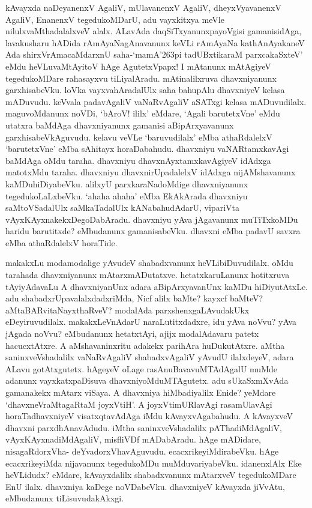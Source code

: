 \noindent
kAvayxda naDeyanenxV AgaliV, mUlavanenxV AgaliV, dheyxVyavanenxV AgaliV, EnanenxV tegedukoMDarU, adu vayxkitxya meVle nilulxvaMthadalalxveV alalx. ALavAda daqSiTxyanunxpayoVgisi gamanisidAga, lavakusharu hADida rAmAyaNagAnavanunx keVLi rAmAyaNa kathAnAyakaneV Ada shirxVrAmacaMdarxnU saha-`ma\-mA\char'263pi tadUBxtikaraM\label{236} parxcakaSxteV' eMdu heVLuvaMtAyitoV hAge AgutetxVpapx! I mAtanunx mAtAgiyeV tegedukoMDare rahasayxvu tiLiyalAradu. mAtinalilxruva dhavxniyanunx garxhisabeVku. loVka vayxva\-hAra\-dalUlx saha bahupAlu dhavxniyeV kelasa mADuvudu. keVvala padavAgaliV vaNaRvAgaliV aSATxgi kelasa\- mADuvudilalx. maguvoMdanunx noVDi, `bAroV! ililx' eMdare, `Agali barutetxVne' eMdu utatxra baMdAga dhavxniyanunx gamanisi aBipArxyavanunx garxhisabeVkAguvudu. kelavu veVLe `baruvudilalx' eMba athaRdalelxV `barutetxVne' eMba sAhitayx horaDabahudu. dhavxniyu vaNARtamxkavAgi baMdAga oMdu taraha. dhavxniyu dhavxnAyxtamxkavAgiyeV idAdxga matotxMdu taraha. dhavxniyu dhavxnirUpadalelxV idAdxga nijAMshavanunx kaMDuhiDiyabeVku. alilxyU parxkaraNadoMdige dhavxniyanunx tegedukoLaLxbeVku. `ahaha ahaha' eMba EkAkArada dhavxniyu saMtoVSadalUlx saMkaTadalUlx kANabahudAdarU, vipariVta vAyxKAyxnakekxDegoDa\-bAradu. dhavxniyu yAva jAgavanunx muTiTxkoMDu haridu barutitxde? eMbudanunx gamanisabeVku. dhavxni eMba padavU savxra eMba athaRdalelxV horaTide.

\medskip

makakxLu modamodalige yAvudeV shabadxvanunx heVLibiDuvudilalx. oMdu tara\-hada dhavxniyanunx mAtarx\-mADutatxve. hetatxkaruLanunx hotitxruva tAyiyAdavaLu A dhavxniyanUnx adara aBipArxyavanUnx kaMDu\- hiDiyutAtxLe. adu shabadxrUpa\-valalxdadxriMda, Nicf alilx baMte? kayxcf baMteV? aMtaBARvitaNayxthaRveV? modalAda parxshenxgaLAvudakUkx eDeyiruvudilalx. makakxLeVnAdarU naraLutitxdadxre, idu yAva noVvu? yAva jAgada noVvu? eMbudanunx hetatxtAyi, ajijx modalAdavaru patetx hacucxtAtxre. A aMshava\-ninxritu adakekx parihAra huDukutAtxre. aMtha saninxveVshadalilx vaNaRvAgaliV shabadxvAgaliV yAvudU ilalxdeyeV, adara ALavu gotAtxgutetx. hAgeyeV oLage rasAnuBavavuMTAdAgalU muMde adanunx vayxkatxpaDi\-suva dhavxniyoMduMTAgutetx. adu sUkaSxmXvAda gamanakekx mAtarx viSaya. A dhavxniya hiMbadi\-yalilx Enide? yeMdare `dhavxneVraMtagaRtaM joyxVtiH'\label{152}. A joyxVtimURlavAgi rasamUlavAgi horaTa\-dhavxniyeV visatxqtavAdAga iMdu kAvayxvAgabahudu. A kAvayxveV dhavxni parxdhAnavAdudu. iMtha saninx\-veVshadalilx pAThadiMdAgaliV, vAyxKAyxnadiMdAgaliV, misfliVDf mADabAradu. hAge mADidare, nisagaR\-dorxVha- deYvadorxVhavAguvudu. ecacxrikeyiMdirabeVku. hAge ecacxrikeyiMda nijavanunx tegedukoMDu muMduvariyabeVku. idanenxlAlx Eke heVLidudx? eMdare, kAvayxdalilx shabadxvanunx mAtarxveV tegedukoMDare EnU ilalx. dhavxniya kaDege noVDabeVku. dhavxniyeV kAvayxda jiVvAtu, eMbudanunx tiLisuvudakAkxgi.

